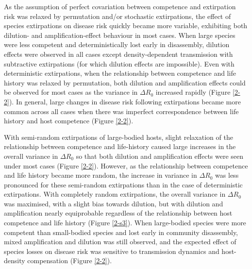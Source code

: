 As the assumption of perfect covariation between competence and extirpation risk was relaxed by permutation and/or stochastic extirpations, the effect of species extirpations on disease risk quickly became more variable, exhibiting both dilution- and amplification-effect behaviour in most cases.
When large species were less competent and deterministically lost early in disassembly, dilution effects were observed in all cases except density-dependent transmission with subtractive extirpations (for which dilution effects are impossible).
Even with deterministic extirpations, when the relationship between competence and life history was relaxed by permutation, both dilution and amplification effects could be observed for most cases as the variance in $\Delta R_0$ increased rapidly (Figure \ref{2-2}).
In general, large changes in disease risk following extirpations became more common across all cases when there was imperfect correspondence between life history and host competence (Figure \ref{2-2}).

With semi-random extirpations of large-bodied hosts, slight relaxation of the relationship between competence and life-history caused large increases in the overall variance in $\Delta R_0$ so that both dilution and amplification effects were seen under most cases (Figure \ref{2-2}).
However, as the relationship between competence and life history became more random, the increase in variance in $\Delta R_0$ was less pronounced for these semi-random extirpations than in the case of deterministic extirpations.
With completely random extirpations, the overall variance in $\Delta R_0$ was maximised, with a slight bias towards dilution, but with dilution and amplification nearly equiprobable regardless of the relationship between host competence and life history (Figure \ref{2-s3}).
When large-bodied species were more competent than small-bodied species and lost early in community disassembly, mixed amplification and dilution was still observed, and the expected effect of species losses on disease risk was sensitive to transmission dynamics and host-density compensation (Figure \ref{2-2}).

